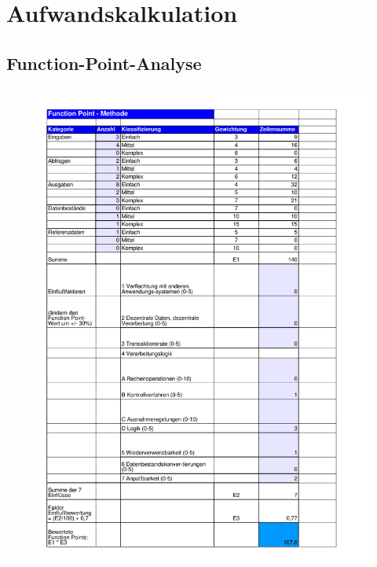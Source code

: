 \clearpage
\chapter{Aufwandskalkulation}



\section{Function-Point-Analyse}

\begin{figure}[!h]
	\centering
    \includegraphics[width=\textwidth]{./FunctionPoint_filled.pdf}
	\label{layout_gesamt}
\end{figure}

\section{}

